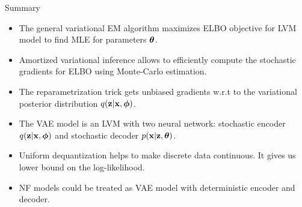 \begin{frame}{Summary}
	\begin{itemize}
		\item The general variational EM algorithm maximizes ELBO objective for LVM model to find MLE for parameters $\boldsymbol{\theta}$.	
		\vfill
		\item Amortized variational inference allows to efficiently compute the stochastic gradients for ELBO using Monte-Carlo estimation.
		\vfill
		\item The reparametrization trick gets unbiased gradients w.r.t to the variational posterior distribution $q(\mathbf{z} | \mathbf{x}, \boldsymbol{\phi})$.
		\vfill
		\item The VAE model is an LVM with two neural network: stochastic encoder $q(\mathbf{z} | \mathbf{x}, \boldsymbol{\phi})$ and stochastic decoder $p(\mathbf{x} | \mathbf{z}, \boldsymbol{\theta})$.
		\vfill
		\item Uniform dequantization helps to make discrete data continuous. It gives us lower bound on the log-likelihood.
		\vfill
		\item NF models could be treated as VAE model with deterministic encoder and decoder.
	\end{itemize}
\end{frame}
 